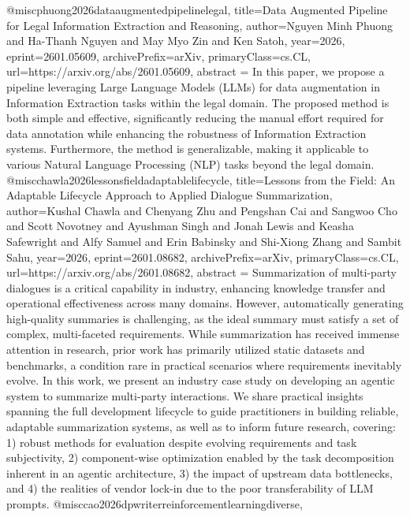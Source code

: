{}@misc{phuong2026dataaugmentedpipelinelegal,
      title={Data Augmented Pipeline for Legal Information Extraction and Reasoning}, 
      author={Nguyen Minh Phuong and Ha-Thanh Nguyen and May Myo Zin and Ken Satoh},
      year={2026},
      eprint={2601.05609},
      archivePrefix={arXiv},
      primaryClass={cs.CL},
      url={https://arxiv.org/abs/2601.05609},
      abstract = {In this paper, we propose a pipeline leveraging Large Language Models (LLMs) for data augmentation in Information Extraction tasks within the legal domain. The proposed method is both simple and effective, significantly reducing the manual effort required for data annotation while enhancing the robustness of Information Extraction systems. Furthermore, the method is generalizable, making it applicable to various Natural Language Processing (NLP) tasks beyond the legal domain.}
}@misc{chawla2026lessonsfieldadaptablelifecycle,
      title={Lessons from the Field: An Adaptable Lifecycle Approach to Applied Dialogue Summarization}, 
      author={Kushal Chawla and Chenyang Zhu and Pengshan Cai and Sangwoo Cho and Scott Novotney and Ayushman Singh and Jonah Lewis and Keasha Safewright and Alfy Samuel and Erin Babinsky and Shi-Xiong Zhang and Sambit Sahu},
      year={2026},
      eprint={2601.08682},
      archivePrefix={arXiv},
      primaryClass={cs.CL},
      url={https://arxiv.org/abs/2601.08682},
      abstract = {Summarization of multi-party dialogues is a critical capability in industry, enhancing knowledge transfer and operational effectiveness across many domains. However, automatically generating high-quality summaries is challenging, as the ideal summary must satisfy a set of complex, multi-faceted requirements. While summarization has received immense attention in research, prior work has primarily utilized static datasets and benchmarks, a condition rare in practical scenarios where requirements inevitably evolve. In this work, we present an industry case study on developing an agentic system to summarize multi-party interactions. We share practical insights spanning the full development lifecycle to guide practitioners in building reliable, adaptable summarization systems, as well as to inform future research, covering: 1) robust methods for evaluation despite evolving requirements and task subjectivity, 2) component-wise optimization enabled by the task decomposition inherent in an agentic architecture, 3) the impact of upstream data bottlenecks, and 4) the realities of vendor lock-in due to the poor transferability of LLM prompts.}
}@misc{cao2026dpwriterreinforcementlearningdiverse,
}
